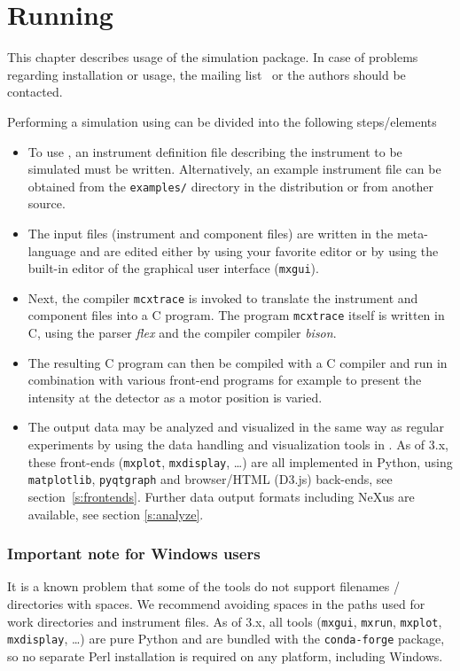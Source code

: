
\chapter{Running \MCX}
\label{c:running}

This chapter describes usage of the \MCX simulation package. 
In case of problems regarding installation or usage, the \MCX mailing
list~\cite{mcxtrace_webpage} or the authors should be contacted.

Performing a simulation using \MCX can be divided into the following
steps/elements
\begin{itemize}
\item{To use \MCX, an instrument
definition file describing the instrument to be simulated must be
written. Alternatively, an example instrument file can be obtained
from the \verb+examples/+ directory in the distribution or from
another source.}
\item{The input files (instrument and component files) are written in the \MCX
meta-language and are edited either by using your favorite editor
or by using the built-in editor of the graphical user interface
(\texttt{mxgui}).}
\item{Next, the \MCX compiler \texttt{mcxtrace} is invoked to translate the instrument and component files into a C program. The program \texttt{mcxtrace} itself is written in C, using the parser \textit{flex} and the compiler compiler \textit{bison}.}
\item{The resulting C program can then be
compiled with a C compiler and run in combination with various
front-end programs for example to present the intensity at the
detector as a motor position is varied.}
\item{The output data may be analyzed and visualized in the same way as regular
    experiments by using the data handling and visualization tools in \MCX.
    As of \MCX 3.x, these front-ends (\texttt{mxplot}, \texttt{mxdisplay}, \ldots) are all implemented in Python, using
    \texttt{matplotlib}, \texttt{pyqtgraph} and browser/HTML (D3.js) back-ends,
    see section~\ref{s:frontends}. Further data output formats including NeXus
    are available, see section \ref{s:analyze}.}
\end{itemize}



\subsection{Important note for Windows users} 
It is a known problem that some of
the \MCX tools do not support filenames / directories with spaces.
We recommend avoiding spaces in the paths used for \MCX work directories
and instrument files. As of \MCX 3.x, all tools (\texttt{mxgui}, \texttt{mxrun},
\texttt{mxplot}, \texttt{mxdisplay}, \ldots) are pure Python and are bundled
with the \texttt{conda-forge} package, so no separate Perl installation is
required on any platform, including Windows.


